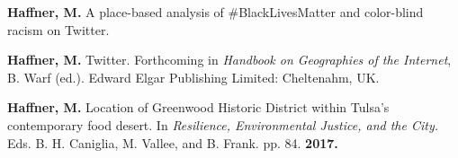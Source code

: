 

\begin{cventries}
   \cventry
      {}
      {}
      {}
      {}
      {
        \begin{cvitems}
          \vspace{-4mm}
        \item
          {\textbf{Haffner, M.}
            A place-based analysis of \#BlackLivesMatter and color-blind racism on Twitter. } \\
          \vspace{-2mm}
        \end{cvitems}
    }

\end{cventries}



\begin{cventries}
   \cventry
      {}
      {}
      {}
      {}
      {
        \begin{cvitems}
          \vspace{-4mm}
        \item {\textbf{Haffner, M.} Twitter. Forthcoming in \textit{Handbook on
              Geographies of the Internet}, B. Warf (ed.). Edward Elgar
            Publishing Limited: Cheltenahm, UK.}
          \vspace{-2mm}
        \end{cvitems}
    }

\end{cventries}



\begin{cventries}
   \cventry
      {}
      {}
      {}
      {}
      {
        \begin{cvitems}
          \vspace{-4mm}
        \item {\textbf{Haffner, M.} Location of Greenwood Historic District
            within Tulsa's contemporary food desert. In \textit{Resilience,
              Environmental Justice, and the City.} Eds. B. H. Caniglia, M.
            Vallee, and B.
            Frank. pp. 84. \textbf{2017.}} \\
          \vspace{-2mm}
        \end{cvitems}
    }

\end{cventries}